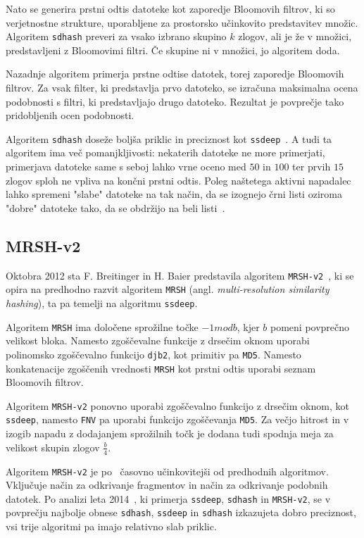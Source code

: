 \documentclass{acm_proc_article-sp}
\begin{document}
Nato se generira prstni odtis datoteke kot zaporedje Bloomovih filtrov, ki so verjetnostne strukture, uporabljene za prostorsko učinkovito predstavitev množic. Algoritem \texttt{sdhash} preveri za vsako izbrano skupino $k$ zlogov, ali je že v množici, predstavljeni z Bloomovimi filtri. Če skupine ni v množici, jo algoritem doda.

Nazadnje algoritem primerja prstne odtise datotek, torej zaporedje Bloomovih filtrov. Za vsak filter, ki predstavlja prvo datoteko, se izračuna maksimalna ocena podobnosti s filtri, ki predstavljajo drugo datoteko. Rezultat je povprečje tako pridobljenih ocen podobnosti.

Algoritem \texttt{sdhash} doseže boljša priklic in preciznost kot \texttt{ssdeep}~\cite{fbhash}. A tudi ta algoritem ima več pomanjkljivosti: nekaterih datoteke ne more primerjati, primerjava datoteke same s seboj lahko vrne oceno med $50$ in $100$ ter prvih $15$ zlogov sploh ne vpliva na končni prstni odtis. Poleg naštetega aktivni napadalec lahko spremeni "slabe" datoteke na tak način, da se izognejo črni listi oziroma "dobre" datoteke tako, da se obdržijo na beli listi~\cite{breitinge2012security}.

\subsection{MRSH-v2}
Oktobra 2012 sta F. Breitinger in H. Baier predstavila algoritem \texttt{MRSH-v2}~\cite{mrsh-v2}, ki se opira na predhodno razvit algoritem \texttt{MRSH} (angl. \emph{multi-resolution similarity hashing}), ta pa temelji na algoritmu \texttt{ssdeep}. 

Algoritem \texttt{MRSH} ima določene sprožilne točke $-1 mod b$, kjer $b$ pomeni povprečno velikost bloka. Namesto zgoščevalne funkcije z drsečim oknom uporabi polinomsko zgoščevalno funkcijo \texttt{djb2}, kot primitiv pa \texttt{MD5}. Namesto konkatenacije zgoščenih vrednosti \texttt{MRSH} kot prstni odtis uporabi seznam Bloomovih filtrov. 

Algoritem \texttt{MRSH-v2} ponovno uporabi zgoščevalno funkcijo z drsečim oknom, kot \texttt{ssdeep}, namesto \texttt{FNV} pa uporabi funkcijo zgoščevanja \texttt{MD5}. Za večjo hitrost in v izogib napadu z dodajanjem sprožilnih točk je dodana tudi spodnja meja za velikost skupin zlogov $\frac{b}{4}$. 

Algoritem \texttt{MRSH-v2} je po~\cite{mrsh-v2} časovno učinkovitejši od predhodnih algoritmov. Vključuje način za odkrivanje fragmentov in način za odkrivanje podobnih datotek. Po analizi leta 2014~\cite{breitinger2014}, ki primerja \texttt{ssdeep}, \texttt{sdhash} in \texttt{MRSH-v2}, se v povprečju najbolje obnese \texttt{sdhash}, \texttt{ssdeep} in \texttt{sdhash} izkazujeta dobro preciznost, vsi trije algoritmi pa imajo relativno slab priklic.
\end{document}
